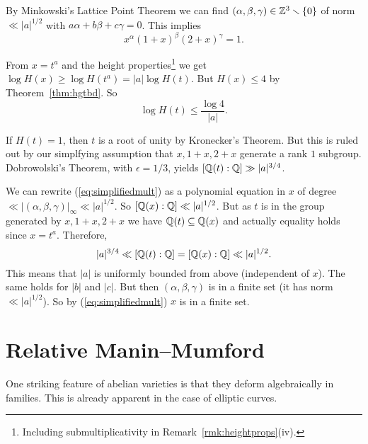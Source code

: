 By Minkowski's Lattice Point Theorem we can find
$(\alpha,\beta,\gamma)\in{\mathbb{Z}}^3\smallsetminus\{0\}$ of norm $\ll
|a|^{1/2}$
with $a\alpha+b\beta+c\gamma=0$. This implies
\begin{equation}
  \label{eq:simplifiedmult}
  x^\alpha(1+x)^\beta(2+x)^\gamma =1.  
\end{equation}

From $x=t^a$ and the height properties\footnote{Including
  submultiplicativity in Remark~\ref{rmk:heightprops}(iv).}  we get
$\log H(x) \ge \log H(t^a) = |a| \log H(t)$. But $H(x)\le  4$ by
Theorem~\ref{thm:hgtbd}. So
\begin{equation*}
  \log H(t)\le \frac{\log 4}{|a|}.
\end{equation*}

If $H(t)=1$, then $t$ is a root of unity by Kronecker's Theorem.
But this is ruled out by our simplfying assumption that $x,1+x,2+x$
generate a rank $1$ subgroup. 
Dobrowolski's Theorem, with $\epsilon=1/3$,  yields $[{\mathbb{Q}}(t):{\mathbb{Q}}] \gg
|a|^{3/4}$.

We can rewrite (\ref{eq:simplifiedmult}) as a polynomial equation
in $x$ of degree $\ll |(\alpha,\beta,\gamma)|_\infty\ll |a|^{1/2}$. 
So $[{\mathbb{Q}}(x):{\mathbb{Q}}] \ll |a|^{1/2}$.
But as $t$ is in the group generated by $x,1+x,2+x$ we have
${\mathbb{Q}}(t)\subseteq{\mathbb{Q}}(x)$ and actually equality holds since $x=t^a$. Therefore,
\begin{equation*}
|a|^{3/4}\ll  [{\mathbb{Q}}(t):{\mathbb{Q}}] = [{\mathbb{Q}}(x):{\mathbb{Q}}]  \ll |a|^{1/2}.
\end{equation*}
This means that $|a|$ is uniformly bounded from above (independent of
$x$). The same holds for $|b|$ and $|c|$. But then
$(\alpha,\beta,\gamma)$ is in a finite set (it has norm
$\ll|a|^{1/2}$).
So by (\ref{eq:simplifiedmult}) $x$ is in a finite set.



\section{Relative Manin--Mumford}


One striking feature of abelian varieties is that they deform
algebraically in families. This is already apparent in the case of
elliptic curves.

